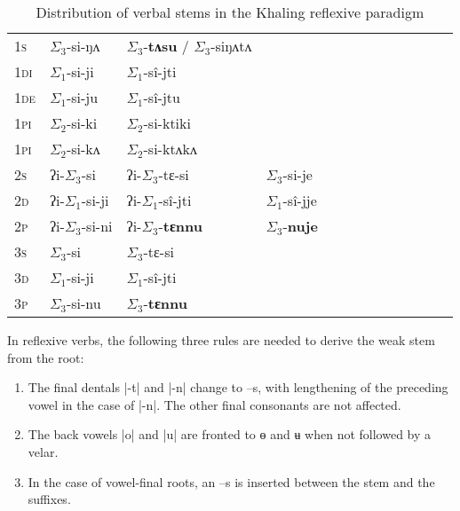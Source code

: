 \documentclass[twoside,a4paper,11pt]{article}
\newcommand{\ipa}[1]{{\phon#1}}
\newcommand{\grise}[1]{\cellcolor{lightgray}\textbf{#1}}
\newcommand{\grisf}[1]{\cellcolor{gray}\textbf{#1}}
\newcommand{\ra}{$\Sigma_1$}
\newcommand{\rbb}{$\Sigma_2$}
\newcommand{\rc}{$\Sigma_3$}
\begin{document}
\begin{table}[h]
\caption{ Distribution of verbal stems in the Khaling reflexive paradigm}
\label{tab:reflstems} \centering 
\begin{tabular}{l|l|l|l|l|l|l|l|l|l|l|l|l}  \toprule
\textsc{1s}  &  \ipa{\rc{}-si-ŋʌ}   &  \ipa{\rc{}-\textbf{tʌsu}} / \ipa{\rc{}-siŋʌtʌ}   \\ 
\textsc{1di}  &  \ipa{\ra{}-si-ji}  \grise{} &  \ipa{\ra{}-sî-jti} \grise{} \\
\textsc{1de}  &  \ipa{\ra{}-si-ju} \grise{}   &  \ipa{\ra{}-sî-jtu} \grise{} \\ 
\textsc{1pi}  &  \ipa{\rbb{}-si-ki} \grisf{}  &  \ipa{\rbb{}-si-ktiki} \grisf{}  \\ 
\textsc{1pi}  &  \ipa{\rbb{}-si-kʌ}  \grisf{}   &  \ipa{\rbb{}-si-ktʌkʌ} \grisf{} \\ 
\midrule
\textsc{2s}  &  \ipa{ʔi-\rc{}-si}   &  \ipa{ʔi-\rc{}-tɛ-si}   &  \ipa{\rc{}-si-je} \\ 
\textsc{2d}  &  \ipa{ʔi-\ra{}-si-ji}  \grise{}  &  \ipa{ʔi-\ra{}-sî-jti} \grise{}   &  \ipa{\ra{}-sî-jje} \grise{} \\
\textsc{2p}  &  \ipa{ʔi-\rc{}-si-ni}   &  \ipa{ʔi-\rc{}-\textbf{tɛnnu}}   &  \ipa{\rc{}-\textbf{nuje}}  \\ 
\midrule
\textsc{3s}  &  \ipa{\rc{}-si}   &  \ipa{\rc{}-tɛ-si} \\ 
\textsc{3d}  &  \ipa{\ra{}-si-ji} \grise{}   &  \ipa{\ra{}-sî-jti}\grise{} \\ 
\textsc{3p}  &  \ipa{\rc{}-si-nu}   &  \ipa{\rc{}-\textbf{tɛnnu}}  \\ 
\bottomrule
\end{tabular}
\end{table}

In reflexive verbs, the following three rules are needed to derive the weak stem from the root:

\begin{enumerate}
\item The final dentals |\ipa{-t}| and |\ipa{-n}| change to --\ipa{s}, with lengthening of the preceding  vowel in the case of |\ipa{-n}|. The other final consonants are not affected.
\item The back vowels |\ipa{o}| and |\ipa{u}| are fronted to \ipa{ɵ} and \ipa{ʉ} when not followed by a velar.
\item In the case of vowel-final roots, an --\ipa{s} is inserted between the stem and the suffixes.
\end{enumerate}
 
\end{document}
